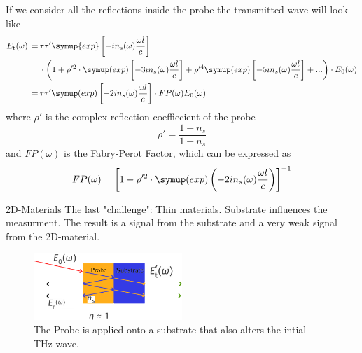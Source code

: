 \documentclass[aspectratio=1610, 9pt]{beamer}
\begin{document}
\begin{frame}
  If we consider all the reflections inside the probe the transmitted wave will look like
  \begin{align*}
    E_\text{t}(\omega) \,=\,& \tau \tau' \symup{exp} \left[-i n_s(\omega) \frac{\omega l }{c}\right] \\
                        & \cdot \left( 1 + \rho'^2 \cdot \symup(exp)\left[ -3 i n_s(\omega) \frac{\omega l }{c}\right] + \rho'^4 \symup(exp) \left[ -5 i n_s(\omega) \frac{\omega l }{c}\right] + ...\right) \cdot E_0 (\omega) \\
                        \,=\,& \tau \tau' \symup(exp)\left[ -2 i n_s(\omega) \frac{\omega l }{c}\right] \cdot FP(\omega) E_0(\omega)
  \end{align*}
  where $\rho'$ is the complex reflection coeffiecient of the probe
  \begin{equation}
    \rho' = \frac{1 - n_s}{1 + n_s}
  \end{equation}
  and $FP(\omega)$ is the Fabry-Perot Factor, which can be expressed as 
  \begin{equation}
    FP(\omega) = \left[1 - \rho'^2 \cdot \symup(exp)\left(- 2 i n_s(\omega )\frac{\omega l }{c}\right)\right]^{-1}
  \end{equation}
\end{frame}

\begin{frame}{2D-Materials}
  The last "challenge": Thin materials.
  Substrate influences the measurment.
  The result is a signal from the substrate and a very weak signal from the 2D-material.
  \begin{figure}
    \includegraphics[width=0.5\textwidth]{images/2d.pdf}
    \caption{The Probe is applied onto a substrate that also alters the intial THz-wave.}
  \end{figure}
\end{frame}
\end{document}
